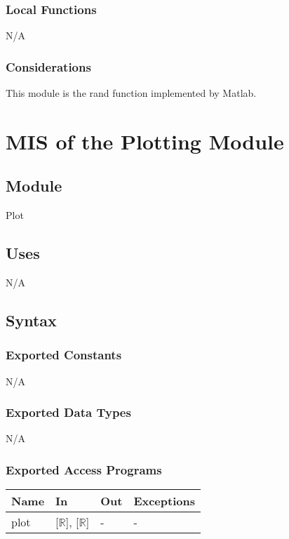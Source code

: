 \documentclass[12pt, titlepage]{article}
\begin{document}
\subsubsection{Local Functions}

N/A

\subsubsection{Considerations}
This module is the rand function implemented by Matlab.

\newpage
\section{MIS of the Plotting Module} \label{sec:Plotting}

\subsection{Module}
Plot

\subsection{Uses}

N/A

\subsection{Syntax}

\subsubsection{Exported Constants}
N/A

\subsubsection{Exported Data Types}

N/A

\subsubsection{Exported Access Programs}

\begin{center}
	\renewcommand*{\arraystretch}{1.5}
	\begin{tabular} {p{}  p{}  p{} 
			p{} } \hline 
		\textbf{Name} & \textbf{In} & \textbf{Out} & \textbf{Exceptions} \\ 
		\hline
		
		plot & [$\mathbb{R}$], [$\mathbb{R}$] & - & - \\ \hline
	\end{tabular}
\end{center}
\end{document}
